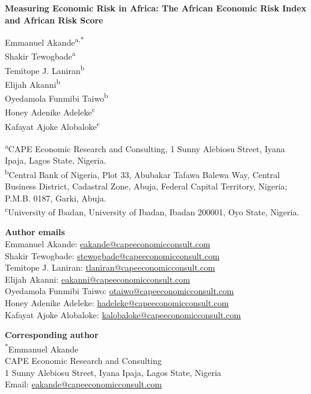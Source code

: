 \documentclass[12pt]{article}
\begin{document}
\begin{center}
{\Large\bfseries Measuring Economic Risk in Africa: The African Economic Risk Index and African Risk Score\par}
\vspace{0.7cm}
Emmanuel Akande\textsuperscript{a,*}\\
Shakir Tewogbade\textsuperscript{a}\\
Temitope J. Laniran\textsuperscript{b}\\
Elijah Akanni\textsuperscript{b}\\
Oyedamola Funmibi Taiwo\textsuperscript{b}\\
Honey Adenike Adeleke\textsuperscript{c}\\
Kafayat Ajoke Alobaloke\textsuperscript{c}
\end{center}
\vspace{0.4cm}
\textsuperscript{a}CAPE Economic Research and Consulting, 1 Sunny Alebiosu Street, Iyana Ipaja, Lagos State, Nigeria.\\
\textsuperscript{b}Central Bank of Nigeria, Plot 33, Abubakar Tafawa Balewa Way, Central Business District, Cadastral Zone, Abuja, Federal Capital Territory, Nigeria; P.M.B. 0187, Garki, Abuja.\\
\textsuperscript{c}University of Ibadan, University of Ibadan, Ibadan 200001, Oyo State, Nigeria.

\textbf{Author emails}\\
Emmanuel Akande: \href{mailto:eakande@capeeconomicconsult.com}{eakande@capeeconomicconsult.com}\\
Shakir Tewogbade: \href{mailto:stewogbade@capeeconomicconsult.com}{stewogbade@capeeconomicconsult.com}\\
Temitope J. Laniran: \href{mailto:tlaniran@capeeconomicconsult.com}{tlaniran@capeeconomicconsult.com}\\
Elijah Akanni: \href{mailto:eakanni@capeeconomicconsult.com}{eakanni@capeeconomicconsult.com}\\
Oyedamola Funmibi Taiwo: \href{mailto:otaiwo@capeeconomicconsult.com}{otaiwo@capeeconomicconsult.com}\\
Honey Adenike Adeleke: \href{mailto:hadeleke@capeeconomicconsult.com}{hadeleke@capeeconomicconsult.com}\\
Kafayat Ajoke Alobaloke: \href{mailto:kalobaloke@capeeconomicconsult.com}{kalobaloke@capeeconomicconsult.com}

\textbf{Corresponding author}\\
\textsuperscript{*}Emmanuel Akande\\
CAPE Economic Research and Consulting\\
1 Sunny Alebiosu Street, Iyana Ipaja, Lagos State, Nigeria\\
Email: \href{mailto:eakande@capeeconomicconsult.com}{eakande@capeeconomicconsult.com}
\end{document}
